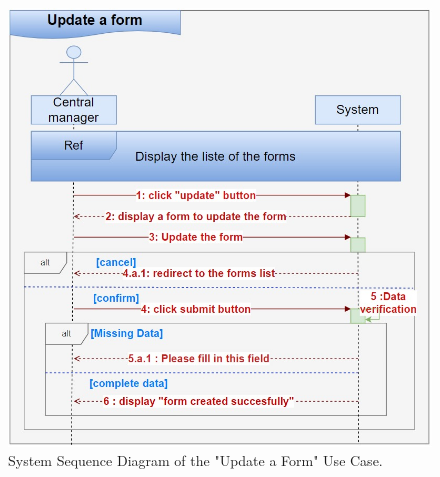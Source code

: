 \clearpage
\begin{figure}[h!]
    \centering
    \includegraphics[width=1\textwidth]{figures/sequpdate a form..png}
    \caption{System Sequence Diagram of the "Update a Form" Use Case.}
\end{figure}
\clearpage


